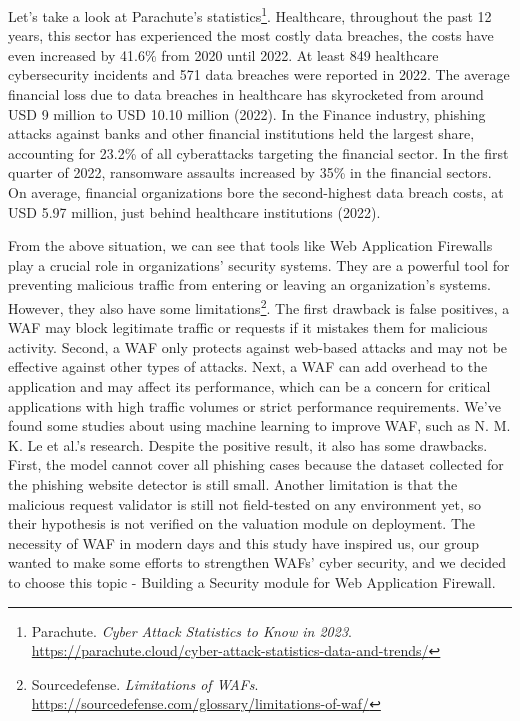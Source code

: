 
Let's take a look at Parachute's statistics\footnote{Parachute. 
\textit{Cyber Attack Statistics to Know in 2023}. \url{https://parachute.cloud/cyber-attack-statistics-data-and-trends/}}. 
Healthcare, throughout the past 12 years, this sector has experienced the most costly data breaches, the costs have even increased by 41.6\% from 2020 until 2022. At least 849 healthcare cybersecurity incidents and 571 data breaches were reported in 2022. The average financial loss due to data breaches in healthcare has skyrocketed from around USD 9 million to USD 10.10 million (2022). In the Finance industry, phishing attacks against banks and other financial institutions held the largest share, accounting for 23.2\% of all cyberattacks targeting the financial sector. In the first quarter of 2022, ransomware assaults increased by 35\% in the financial sectors. On average, financial organizations bore the second-highest data breach costs, at USD 5.97 million, just behind healthcare institutions (2022). 

From the above situation, we can see that tools like Web Application Firewalls play a crucial role in organizations' security systems. They are a powerful tool for preventing malicious traffic from entering or leaving an organization's systems. However, they also have some limitations\footnote{Sourcedefense. \textit{Limitations of WAFs}. \url{https://sourcedefense.com/glossary/limitations-of-waf/}}. The first drawback is false positives, a WAF may block legitimate traffic or requests if it mistakes them for malicious activity. Second, a WAF only protects against web-based attacks and may not be effective against other types of attacks. Next, a WAF can add overhead to the application and may affect its performance, which can be a concern for critical applications with high traffic volumes or strict performance requirements. We've found some studies about using machine learning to improve WAF, such as N. M. K. Le et al.\cite{Khoi}'s research. Despite the positive result, it also has some drawbacks. First, the model cannot cover all phishing cases because the dataset collected for the phishing website detector is still small. Another limitation is that the malicious request validator is still not field-tested on any environment yet, so their hypothesis is not verified on the valuation module on deployment. The necessity of WAF in modern days and this study have inspired us, our group wanted to make some efforts to strengthen WAFs' cyber security, and we decided to choose this topic - Building a Security module for Web Application Firewall.
\newpage
